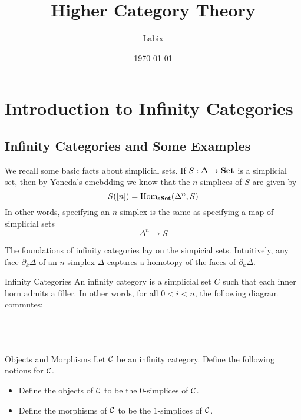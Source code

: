 \documentclass[a4paper]{article}
\title{Higher Category Theory}
\author{Labix}
\date{\today}
\begin{document}
\maketitle
\begin{abstract}
\begin{itemize}
\end{itemize}
\end{abstract}
\pagebreak
\tableofcontents

\pagebreak
\section{Introduction to Infinity Categories}
\subsection{Infinity Categories and Some Examples}
We recall some basic facts about simplicial sets. If $S:\Delta\to\bold{Set}$ is a simplicial set, then by Yoneda's emebdding we know that the $n$-simplices of $S$ are given by $$S([n])=\operatorname{Hom}_\bold{sSet}(\Delta^n,S)$$ In other words, specifying an $n$-simplex is the same as specifying a map of simplicial sets $$\Delta^n\to S$$



The foundations of infinity categories lay on the simpicial sets. Intuitively, any face $\partial_k\Delta$ of an $n$-simplex $\Delta$ captures a homotopy of the faces of $\partial_k\Delta$. 

\begin{defn}{Infinity Categories}{} An infinity category is a simplicial set $C$ such that each inner horn admits a filler. In other words, for all $0<i<n$, the following diagram commutes: \\~\\
\\~\\
\end{defn}

\begin{defn}{Objects and Morphisms}{} Let $\mathcal{C}$ be an infinity category. Define the following notions for $\mathcal{C}$. 
\begin{itemize}
\item Define the objects of $\mathcal{C}$ to be the $0$-simplices of $\mathcal{C}$. 
\item Define the morphisms of $\mathcal{C}$ to be the $1$-simplices of $\mathcal{C}$. 
\end{itemize}
\end{defn}
\end{document}
